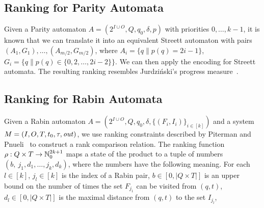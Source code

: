 \subsection*{Ranking for Parity Automata}

Given a Parity automaton
$A = (2^{I\cup O}, Q, q_0, \delta, p)$
with priorities $0,\dots,k-1$,
it is known that we can translate it into an equivalent Streett automaton with pairs
$(A_1,G_1), \dots , (A_{m/2},G_{m/2})$,
where
$A_i=\{q \| p(q)=2i-1 \}$, $G_i=\{q \| p(q) \in \{0,2,\dots ,2i-2\} \}$.
We can then apply the encoding for Streett automata.
The resulting ranking resembles Jurdzi\'nski's progress measure~\cite{jurdzinski2000small}.


\subsection{Ranking for Rabin Automata}

Given a Rabin automaton
$A = (2^{I\cup O}, Q, q_0, \delta, \{(F_i,I_i)\}_{i\in [k]})$
and a system $M = (I,O,T,t_0,\tau,\mathit{out})$,
we use ranking constraints described by Piterman and Pnueli~\cite{Nir06} to
construct a rank comparison relation.
The ranking function $\rho: Q \times T \to \mathbb{N}_0^{2k+1}$
maps a state of the product to a tuple of numbers
$(b, ~j_1,\!d_1, \dots , j_k,\!d_k)$,
where the numbers have the following meaning.
For each $l \in [k]$,
\li
\- $j_l \in [k]$ is the index of a Rabin pair,
\- $b   \in [0,|Q \times T|]$ is an upper bound on the number of times the set $F_{j_1}$ can be visited from $(q,t)$, 
\- $d_l \in [0, |Q\times T|]$ is the maximal distance from $(q,t)$ to the set $I_{j_l}$,
\il

